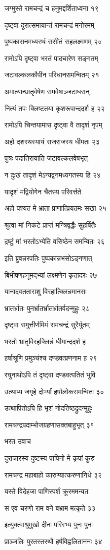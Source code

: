 जग्मुस्ते रामचन्द्रं च हनुमद्दर्शिताध्वना १९

दृष्ट्वा दूरात्समायान्तं रामचन्द्रं मनोरमम्

पुष्पकासनमध्यस्थं ससीतं सहलक्ष्मणम् २०

रामोऽपि दृष्ट्वा भरतं पादचारेण सङ्गतम्

जटावल्कलकौपीन परिधानसमन्वितम् २१

अमात्यान्भ्रातृवेषेण समवेषाञ्जटाधरान्

नित्यं तपः क्लिष्टतया कृशरूपान्ददर्श ह २२

रामोऽपि चिन्तयामास दृष्ट्वा वै तादृशं नृपम्

अहो दशरथस्यायं राजराजस्य धीमतः २३

पुत्रः पदातिरायाति जटावल्कलवेषभृत्

न दुःखं तादृशं मेऽन्यद्वनमध्यगतस्य हि २४

यादृशं मद्वियोगेन चैतस्य परिवर्त्तते

अहो पश्यत मे भ्राता प्राणात्प्रियतमः सखा २५

श्रुत्वा मां निकटे प्राप्तं मन्त्रिवृद्धैः सुहर्षितैः

द्रष्टुं मां भरतोऽभ्येति वसिष्ठेन समन्वितः २६

इति ब्रुवन्नरपतिः पुष्पकान्नभसोऽङ्गणात्

बिभीषणहनूमद्भ्यां लक्ष्मणेन कृतादरः २७

यानादवतताराशु विरहात्क्लिन्नमानसः

भ्रातर्भ्रातः पुनर्भ्रातर्भ्रातर्भ्रातर्वदन्मुहुः २८

दृष्ट्वा समुत्तीर्णमिमं रामचन्द्रं सुरैर्युतम्

भरतो भ्रातृविरहक्लिन्नं धीमान्ददर्श ह

हर्षाश्रूणि प्रमुञ्चंश्च दण्डवत्प्रणनाम ह २९

रघुनाथोऽपि तं दृष्ट्वा दण्डवत्पतितं भुवि

उत्थाप्य जगृहे दोर्भ्यां हर्षालोकसमन्वितः ३०

उत्थापितोऽपि हि भृशं नोदतिष्ठद्रुदन्मुहुः

रामचन्द्रपदाम्भोजग्रहणासक्तबाहुभृत् ३१

भरत उवाच

दुराचारस्य दुष्टस्य पापिनो मे कृपां कुरु

रामचन्द्र महाबाहो कारुण्यात्करुणानिधे ३२

यस्ते विदेहजा पाणिस्पर्शं क्रूरममन्यत

स एव चरणो राम वने बभ्राम मत्कृते ३३

इत्युक्त्वाश्रुमुखो दीनः परिरभ्य पुनः पुनः

प्राञ्जलिः पुरतस्तस्थौ हर्षविह्वलिताननः ३४

